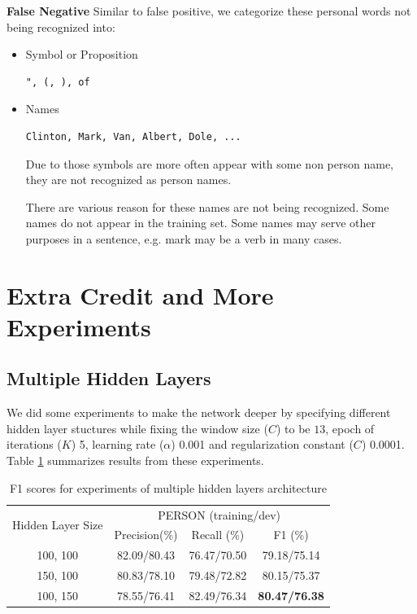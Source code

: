 \documentclass[letterpaper]{article}
\begin{document}
\textbf{False Negative} Similar to false positive, we categorize these personal words not being recognized into:
\begin{itemize}
\item Symbol or Proposition
\begin{verbatim}
", (, ), of
\end{verbatim}
\item Names
\begin{verbatim}
Clinton, Mark, Van, Albert, Dole, ...
\end{verbatim}

Due to those symbols are more often appear with some non person name, they are not recognized as person names.

There are various reason for these names are not being recognized. Some names do not appear in the training set. Some names may serve other purposes in a sentence, e.g. mark may be a verb in many cases.
\end{itemize}


\section{Extra Credit and More Experiments}

\subsection{Multiple Hidden Layers}
We did some experiments to make the network deeper by specifying different hidden layer stuctures while fixing the window size ($C$) to be $13$, epoch of iterations ($K$) 5, learning rate ($\alpha$) 0.001 and regularization constant ($C$) 0.0001. Table \ref{tab:multihidden} summarizes results from these experiments.
\begin{table}[h]
\begin{center}
\begin{tabular}{|c|c|c|c|}
\hline
\multirow{2}{*}{Hidden Layer Size} & 
\multicolumn{3}{|c|}{PERSON (training/dev)}
\\
\hhline{~---}
& Precision(\%) & Recall (\%) & F1 (\%) \\
\hline
100, 100 & 82.09/80.43 & 76.47/70.50 & 79.18/75.14
\\ \hline
150, 100 & 80.83/78.10  & 79.48/72.82 & 80.15/75.37
\\ \hline
100, 150 & 78.55/76.41 & 82.49/76.34 & \textbf{80.47/76.38} \\
\hline
\end{tabular}
\caption{F1 scores for experiments of multiple hidden layers architecture}
\label{tab:multihidden}
\end{center}
\end{table}
\end{document}
